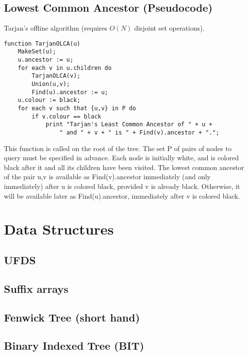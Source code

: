 \documentclass[9pt]{extarticle}
\begin{document}
\begin{multicols*}{3}
\subsection{Lowest Common Ancestor (Pseudocode)} %
Tarjan's offline algorithm (requires $O(N)$ disjoint set operations).
\begin{lstlisting}
function TarjanOLCA(u)
    MakeSet(u);
    u.ancestor := u;
    for each v in u.children do
        TarjanOLCA(v);
        Union(u,v);
        Find(u).ancestor := u;
    u.colour := black;
    for each v such that {u,v} in P do
        if v.colour == black
            print "Tarjan's Least Common Ancestor of " + u +
                " and " + v + " is " + Find(v).ancestor + ".";
\end{lstlisting}
This function is called on the root of the tree. The set P of pairs of nodes to
query must be specified in advance. Each node is initially white, and is
colored black after it and all its children have been visited. The lowest
common ancestor of the pair {u,v} is available as Find(v).ancestor immediately
(and only immediately) after u is colored black, provided v is already black.
Otherwise, it will be available later as Find(u).ancestor, immediately after v
is colored black.

\section{Data Structures}

\subsection{UFDS} %


\subsection{Suffix arrays} %


\subsection{Fenwick Tree (short hand)}


\subsection{Binary Indexed Tree (BIT)} %



\end{multicols*}
\end{document}
